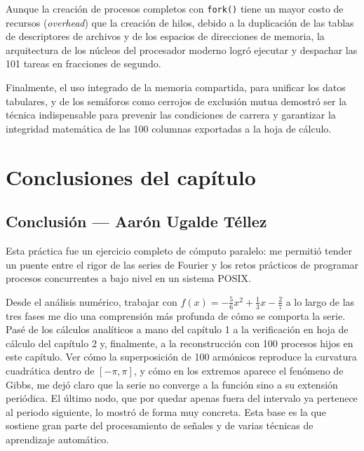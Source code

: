 Aunque la creación de procesos completos con \texttt{fork()} tiene un mayor costo de recursos (\textit{overhead}) que la creación de hilos, debido a la duplicación de las tablas de descriptores de archivos y de los espacios de direcciones de memoria, la arquitectura de los núcleos del procesador moderno logró ejecutar y despachar las 101 tareas en fracciones de segundo.

Finalmente, el uso integrado de la memoria compartida, para unificar los datos tabulares, y de los semáforos como cerrojos de exclusión mutua demostró ser la técnica indispensable para prevenir las condiciones de carrera y garantizar la integridad matemática de las 100 columnas exportadas a la hoja de cálculo.

\section{Conclusiones del capítulo}
\label{sec:cap03:conclusiones}

\subsection{Conclusión — Aarón Ugalde Téllez}
\label{sec:cap03:concl:aaron}

Esta práctica fue un ejercicio completo de cómputo paralelo: me permitió tender un puente entre el rigor de las series de Fourier y los retos prácticos de programar procesos concurrentes a bajo nivel en un sistema POSIX.

Desde el análisis numérico, trabajar con $f(x) = -\frac{5}{6}x^2 + \frac{1}{3}x - \frac{2}{7}$ a lo largo de las tres fases me dio una comprensión más profunda de cómo se comporta la serie. Pasé de los cálculos analíticos a mano del capítulo 1 a la verificación en hoja de cálculo del capítulo 2 y, finalmente, a la reconstrucción con 100 procesos hijos en este capítulo. Ver cómo la superposición de 100 armónicos reproduce la curvatura cuadrática dentro de $[-\pi, \pi]$, y cómo en los extremos aparece el fenómeno de Gibbs, me dejó claro que la serie no converge a la función sino a su extensión periódica. El último nodo, que por quedar apenas fuera del intervalo ya pertenece al periodo siguiente, lo mostró de forma muy concreta. Esta base es la que sostiene gran parte del procesamiento de señales y de varias técnicas de aprendizaje automático.

